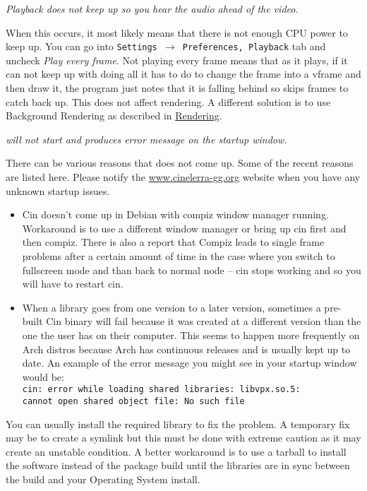 \textit{Playback does not keep up so you hear the audio ahead of the video.}

When this occurs, it most likely means that there is not enough CPU power to keep up. You can go into \texttt{Settings $\rightarrow$ Preferences, Playback} tab and uncheck \textit{Play every frame}. Not playing every frame means that as it plays, if it can not keep up with doing all it has to do to change the frame into a vframe and then draw it, the program just notes that it is falling behind so skips frames to catch back up. This does not affect rendering. A different solution is to use Background Rendering as described in \href{sec:background_rendering}{Rendering}.
\bigskip

\textit{\CGG{} will not start and produces error message on the startup window.}

There can be various reasons that \CGG{} does not come up. Some of the recent reasons are listed here. Please notify the {\small \href{http://www.cinelerra-gg.org/}{www.cinelerra-gg.org}} website when you have any unknown startup issues.
\medskip

\begin{itemize}[nosep]
	\item Cin doesn't come up in Debian with compiz window manager running. Workaround is to use a different window manager or bring up cin first and then compiz. There is also a report that Compiz leads to single frame problems after a certain amount of time in the case where you switch to fullscreen mode and than back to normal node -- cin stops working and so you will have to restart cin.
	\item When a library goes from one version to a later version, sometimes a pre-built Cin binary will fail because it was created at a different version than the one the user has on their computer. This seems to happen more frequently on Arch distros because Arch has continuous releases and is usually kept up to date. An example of the error message you might see in your startup window would be:\\
	\texttt{cin: error while loading shared libraries: libvpx.so.5: \\
	cannot open shared object file: No such file}
\end{itemize}
\medskip

You can usually install the required library to fix the problem. A temporary fix may be to create a symlink but this must be done with extreme caution as it may create an unstable condition. A better workaround is to use a tarball to install the software instead of the package build until the libraries are in sync between the build and your Operating System install.
\bigskip

